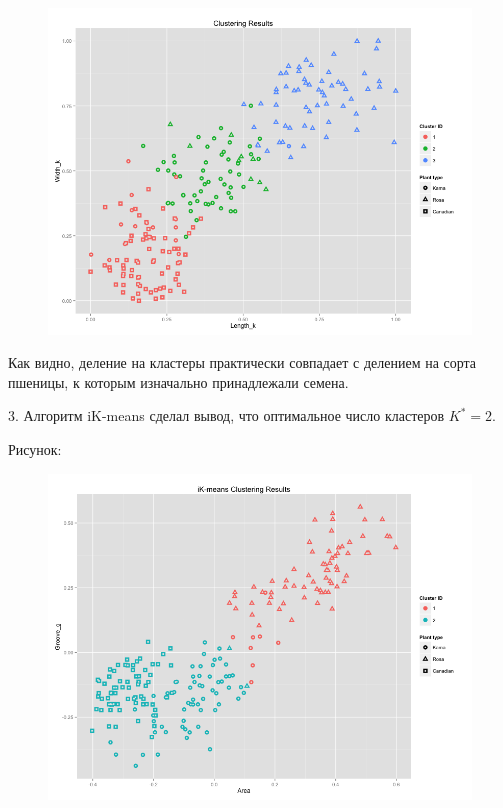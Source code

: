 \documentclass{article}
\begin{document}
\begin{figure}[H] 
\centering
\includegraphics[scale=0.55]{img/6_kmeans_length_width.png}
\label{fig :metka1}
\end{figure}

Как видно, деление на кластеры практически совпадает с делением на сорта пшеницы, к которым изначально принадлежали семена.

\bigskip

3. Алгоритм iK-means сделал вывод, что оптимальное число кластеров $K^{*} = 2$.

Рисунок:

\begin{figure}[H] 
\centering
\includegraphics[scale=0.55]{img/6_ikmeans.png}
\label{fig :metka1}
\end{figure}
\end{document}
